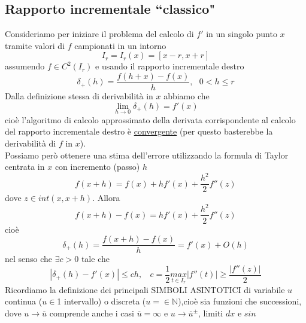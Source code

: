 \subsection{Rapporto incrementale ``classico"}
Consideriamo per iniziare il problema del calcolo di $f'$ in un singolo punto $x$ tramite valori di $f$ campionati in un intorno 
\begin{equation*}
    I_r=I_r(x)=[x-r,x+r]
\end{equation*}
assumendo $f\in C^2(I_r)$ e usando
il rapporto incrementale destro 
\begin{equation*}
    \delta_+(h)=\frac{f(h+x)-f(x)}{h},\  \  \  0<h\leq r
\end{equation*}
Dalla definizione stessa di derivabilità in $x$ abbiamo che
\begin{equation*}
    \underset{h\rightarrow0}{\lim}\delta_+(h)=f'(x)
\end{equation*}
cioè l'algoritmo di calcolo approssimato della derivata corrispondente al calcolo del rapporto incrementale destro è \uline{convergente} (per questo basterebbe la derivabilità di $f$ in $x$).\\Possiamo però ottenere una
stima dell'errore utilizzando la formula di Taylor centrata in $x$ con incremento (passo) $h$
\begin{equation*}
    f(x+h)=f(x)+hf'(x)+\frac{h^2}{2}f''(z)
\end{equation*}
dove $z\in int(x,x+h)$. Allora
\begin{equation*}
    f(x+h)-f(x)=hf'(x)+\frac{h^2}{2}f''(z)
\end{equation*}
cioè
\begin{equation*}
    \delta_+(h)=\frac{f(x+h)-f(x)}{h}=f'(x)+O(h)
\end{equation*}
nel senso che $\exists c>0$ tale che 
\begin{equation*}
    |\delta_+(h)-f'(x)|\leq ch,\  \  \  \  c=\frac{1}{2}\underset{t\in I_r}{max}|f''(t)|\geq\frac{|f''(z)|}{2}
\end{equation*}
Ricordiamo la definizione dei principali SIMBOLI ASINTOTICI di variabile $u$ continua ($u\in$1 intervallo) o discreta ($u=\in \mathbb{N}$),cioè sia funzioni che successioni, dove $u \rightarrow \overline{u}$ comprende anche i casi $\overline{u}=\infty$ e $u \rightarrow \overline{u}^{\pm}$, limiti $dx$ e $sin$
